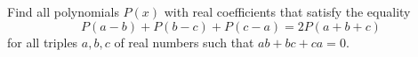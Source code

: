 Find all polynomials $P(x)$ with real coefficients that satisfy the equality
\[ P(a - b) + P(b - c) + P(c - a) = 2P(a + b + c) \]
for all triples $a, b, c$ of real numbers such that $ab + bc + ca = 0$.
